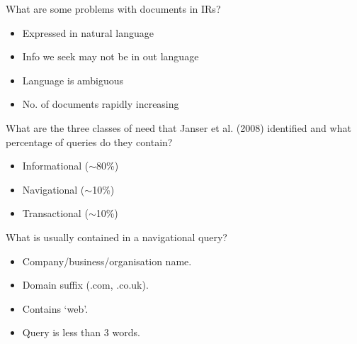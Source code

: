 \documentclass[2by4,grid]{flashcards}
\begin{document}

\begin{flashcard}{What are some problems with documents in IRs?}
	\begin{center}
		\begin{itemize}
            \item Expressed in natural language
            \item Info we seek may not be in out language
            \item Language is ambiguous
            \item No. of documents rapidly increasing
        \end{itemize}
	\end{center}
\end{flashcard}

\begin{flashcard}{What are the three classes of need that Janser et al. (2008) identified and what percentage of queries do they contain?}
	\begin{center}
		\begin{itemize}
            \item Informational ($\sim$80\%)
            \item Navigational ($\sim$10\%)
            \item Transactional ($\sim$10\%)
        \end{itemize}
	\end{center}
\end{flashcard}

\begin{flashcard}{What is usually contained in a navigational query?}
	\begin{center}
        \begin{itemize}
            \item Company/business/organisation name.
            \item Domain suffix (.com, .co.uk).
            \item Contains `web'.
            \item Query is less than 3 words.
        \end{itemize}
	\end{center}
\end{flashcard}
\end{document}
